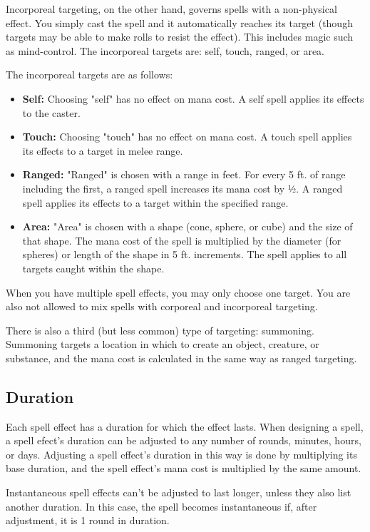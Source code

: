 Incorporeal targeting, on the other hand, governs spells with a non-physical
effect. You simply cast the spell and it automatically reaches its target (though
targets may be able to make rolls to resist the effect). This includes magic
such as mind-control. The incorporeal targets are: self, touch, ranged, or
area.

The incorporeal targets are as follows:
\begin{itemize}
    \item \textbf{Self:} Choosing "self" has no effect on mana cost. A self
        spell applies its effects to the caster.
    \item \textbf{Touch:} Choosing "touch" has no effect on mana cost. A touch
        spell applies its effects to a target in melee range.
    \item \textbf{Ranged:} "Ranged" is chosen with a range in feet. For every
        5 ft. of range including the first, a ranged spell increases
        its mana cost by ½. A ranged spell applies its effects to a
        target within the specified range.
    \item \textbf{Area:} "Area" is chosen with a shape (cone, sphere, or cube)
        and the size of that shape. The mana cost of the spell is multiplied
        by the diameter (for spheres) or length of the shape in 5 ft. increments.
        The spell applies to all targets caught within the shape.
\end{itemize}

When you have multiple spell effects, you may only choose one target. You are
also not allowed to mix spells with corporeal and incorporeal targeting.

There is also a third (but less common) type of targeting: summoning. Summoning
targets a location in which to create an object, creature, or substance, and
the mana cost is calculated in the same way as ranged targeting.

\subsection{Duration}
Each spell effect has a duration for which the effect lasts. When designing a
spell, a spell efect's duration can be adjusted to any number of rounds,
minutes, hours, or days. Adjusting a spell effect's duration in this way is
done by multiplying its base duration, and the spell effect's mana cost is
multiplied by the same amount.

Instantaneous spell effects can't be adjusted to last longer, unless they also
list another duration. In this case, the spell becomes instantaneous if, after
adjustment, it is 1 round in duration.

